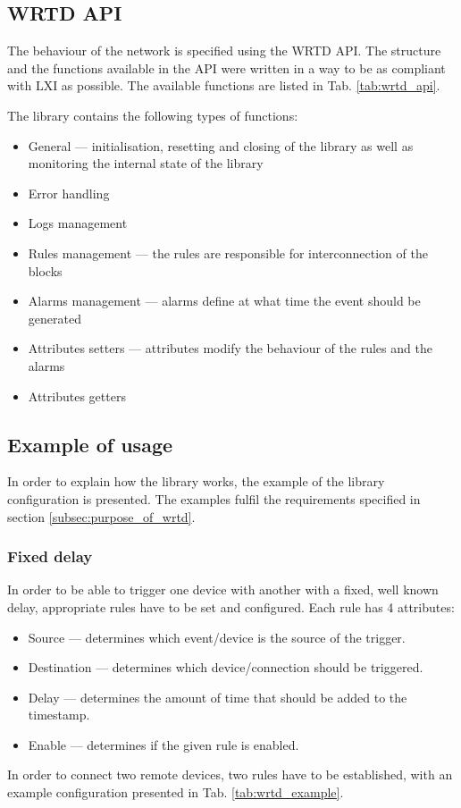     \subsection{WRTD API}
        The behaviour of the network is specified using the WRTD API. The structure and the functions available in the API were written in a way to be as compliant with LXI as possible. The available functions are listed in Tab. \ref{tab:wrtd_api}.
        
        The library contains the following types of functions:
        \begin{itemize}
            \item General --- initialisation, resetting and closing of the library as well as monitoring the internal state of the library
            \item Error handling
            \item Logs management
            \item Rules management --- the rules are responsible for interconnection of the blocks
            \item Alarms management --- alarms define at what time the event should be generated
            \item Attributes setters --- attributes modify the behaviour of the rules and the alarms
            \item Attributes getters
        \end{itemize}
        
        
        
    \subsection{Example of usage}
        In order to explain how the library works, the example of the library configuration is presented. The examples fulfil the requirements specified in section \ref{subsec:purpose_of_wrtd}.
        
        \subsubsection{Fixed delay} \label{subsec:WRTD_fixed_delay}
            In order to be able to trigger one device with another with a fixed, well known delay, appropriate rules have to be set and configured. Each rule has 4 attributes:
            \begin{itemize}
                \item Source --- determines which event/device is the source of the trigger.
                \item Destination --- determines which device/connection should be triggered.
                \item Delay --- determines the amount of time that should be added to the timestamp.
                \item Enable --- determines if the given rule is enabled.
            \end{itemize}
            In order to connect two remote devices, two rules have to be established, with an example configuration presented in Tab. \ref{tab:wrtd_example}.
            
